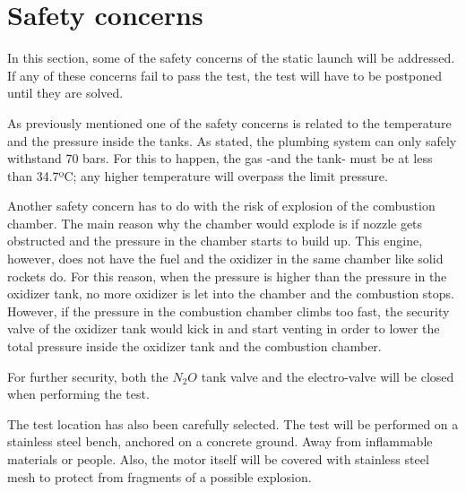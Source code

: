 
\section*{Safety concerns}

In this section, some of the safety concerns of the static launch will be addressed. If any of these concerns fail to pass the test, the test will have to be postponed until they are solved.

As previously mentioned one of the safety concerns is related to the temperature and the pressure inside the tanks. As stated, the plumbing system can only safely withstand 70 bars. For this to happen, the gas -and the tank- must be at less than 34.7ºC; any higher temperature will overpass the limit pressure.

Another safety concern has to do with the risk of explosion of the combustion chamber. The main reason why the chamber would explode is if nozzle gets obstructed and the pressure in the chamber starts to build up. This engine, however, does not have the fuel and the oxidizer in the same chamber like solid rockets do. For this reason, when the pressure is higher than the pressure in the oxidizer tank, no more oxidizer is let into the chamber and the combustion stops. However, if the pressure in the combustion chamber climbs too fast, the security valve of the oxidizer tank would kick in and start venting in order to lower the total pressure inside the oxidizer tank and the combustion chamber.

For further security, both the $N_2O$ tank valve and the electro-valve will be closed when performing the test.

The test location has also been carefully selected. The test will be performed on a stainless steel bench, anchored on a concrete ground. Away from inflammable materials or people. Also, the motor itself will be covered with stainless steel mesh to protect from fragments of a possible explosion.
